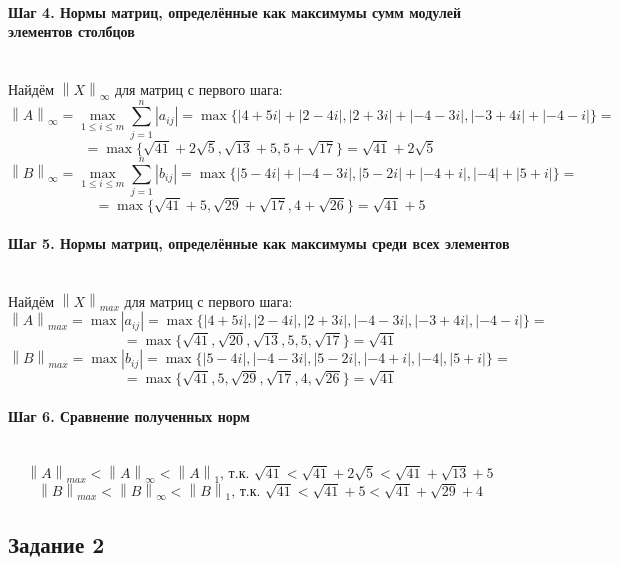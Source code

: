\documentclass{article}
\begin{document}
\paragraph*{Шаг 4. Нормы матриц, определённые как максимумы сумм модулей элементов столбцов} \, \\
Найдём $\left\lVert X\right\rVert _\infty$ для матриц с первого шага:
$$
    \left\lVert A\right\rVert _\infty = \max_{1\le i \le m}\sum\limits_{j=1}^{n}|a_{ij}| = \max\{|4+5i|+|2-4i|, |2+3i|+|-4-3i|, |-3+4i|+|-4-i|\} =
$$
$$
    = \max\{\sqrt{41}+2\sqrt{5}, \sqrt{13}+5, 5+\sqrt{17}\} = \sqrt{41}+2\sqrt{5}
$$
$$
    \left\lVert B\right\rVert _\infty = \max_{1\le i \le m}\sum\limits_{j=1}^{n}|b_{ij}| = \max\{|5-4i|+|-4-3i|, |5-2i|+|-4+i|, |-4|+|5+i|\} =
$$
$$
    = \max\{\sqrt{41}+5, \sqrt{29}+\sqrt{17}, 4+\sqrt{26}\} = \sqrt{41}+5
$$

\paragraph*{Шаг 5. Нормы матриц, определённые как максимумы среди всех элементов} \, \\
Найдём $\left\lVert X\right\rVert _{max}$ для матриц с первого шага:
$$
    \left\lVert A\right\rVert _{max} = \max|a_{ij}| = \max\{|4+5i|, |2-4i|, |2+3i|, |-4-3i|, |-3+4i|, |-4-i|\} =
$$
$$
    = \max\{\sqrt{41}, \sqrt{20}, \sqrt{13}, 5, 5, \sqrt{17}\} = \sqrt{41}
$$
$$
    \left\lVert B\right\rVert _{max} = \max|b_{ij}| = \max\{|5-4i|, |-4-3i|, |5-2i|, |-4+i|, |-4|, |5+i|\} =
$$
$$
    = \max\{\sqrt{41}, 5, \sqrt{29}, \sqrt{17}, 4, \sqrt{26}\} = \sqrt{41}
$$

\paragraph*{Шаг 6. Сравнение полученных норм} \, \\
$$\left\lVert A\right\rVert _{max} < \left\lVert A\right\rVert _\infty < \left\lVert A\right\rVert _1\text{, т.к. } \sqrt{41} < \sqrt{41}+2\sqrt{5} < \sqrt{41}+\sqrt{13}+5$$
$$\left\lVert B\right\rVert _{max} < \left\lVert B\right\rVert _\infty < \left\lVert B\right\rVert _1\text{, т.к. } \sqrt{41} < \sqrt{41}+5 < \sqrt{41}+\sqrt{29}+4$$

\subsection*{Задание 2}
\end{document}

